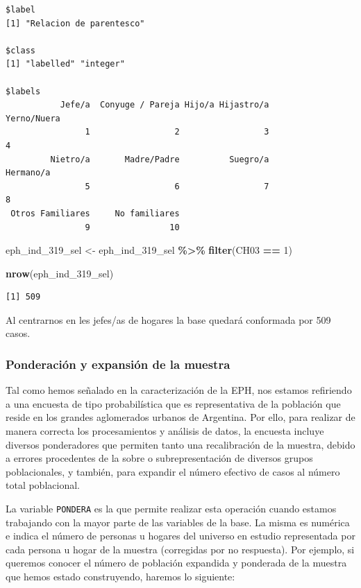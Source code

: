 \documentclass[
]{article}
\newenvironment{Shaded}{\begin{snugshade}}{\end{snugshade}}
\newcommand{\DecValTok}[1]{\textcolor[rgb]{0.00,0.00,0.81}{#1}}
\newcommand{\FunctionTok}[1]{\textcolor[rgb]{0.13,0.29,0.53}{\textbf{#1}}}
\newcommand{\NormalTok}[1]{#1}
\newcommand{\OtherTok}[1]{\textcolor[rgb]{0.56,0.35,0.01}{#1}}
\newcommand{\SpecialCharTok}[1]{\textcolor[rgb]{0.81,0.36,0.00}{\textbf{#1}}}
\begin{document}
\begin{verbatim}
$label
[1] "Relacion de parentesco"

$class
[1] "labelled" "integer" 

$labels
           Jefe/a  Conyuge / Pareja Hijo/a Hijastro/a       Yerno/Nuera 
                1                 2                 3                 4 
         Nietro/a       Madre/Padre          Suegro/a         Hermano/a 
                5                 6                 7                 8 
 Otros Familiares     No familiares 
                9                10 
\end{verbatim}

\begin{Shaded}
\begin{Highlighting}[]
\NormalTok{eph\_ind\_319\_sel }\OtherTok{\textless{}{-}}\NormalTok{ eph\_ind\_319\_sel }\SpecialCharTok{\%\textgreater{}\%}
    \FunctionTok{filter}\NormalTok{(CH03 }\SpecialCharTok{==} \DecValTok{1}\NormalTok{)}

\FunctionTok{nrow}\NormalTok{(eph\_ind\_319\_sel)}
\end{Highlighting}
\end{Shaded}

\begin{verbatim}
[1] 509
\end{verbatim}

Al centrarnos en les jefes/as de hogares la base quedará conformada por 509 casos.

\hypertarget{ponderaciuxf3n-y-expansiuxf3n-de-la-muestra}{%
\subsubsection{Ponderación y expansión de la muestra}\label{ponderaciuxf3n-y-expansiuxf3n-de-la-muestra}}

Tal como hemos señalado en la caracterización de la EPH, nos estamos refiriendo a una encuesta de tipo probabilística que es representativa de la población que reside en los grandes aglomerados urbanos de Argentina. Por ello, para realizar de manera correcta los procesamientos y análisis de datos, la encuesta incluye diversos ponderadores que permiten tanto una recalibración de la muestra, debido a errores procedentes de la sobre o subrepresentación de diversos grupos poblacionales, y también, para expandir el número efectivo de casos al número total poblacional.

La variable \texttt{PONDERA} es la que permite realizar esta operación cuando estamos trabajando con la mayor parte de las variables de la base. La misma es numérica e indica el número de personas u hogares del universo en estudio representada por cada persona u hogar de la muestra (corregidas por no respuesta). Por ejemplo, si queremos conocer el número de población expandida y ponderada de la muestra que hemos estado construyendo, haremos lo siguiente:
\end{document}
